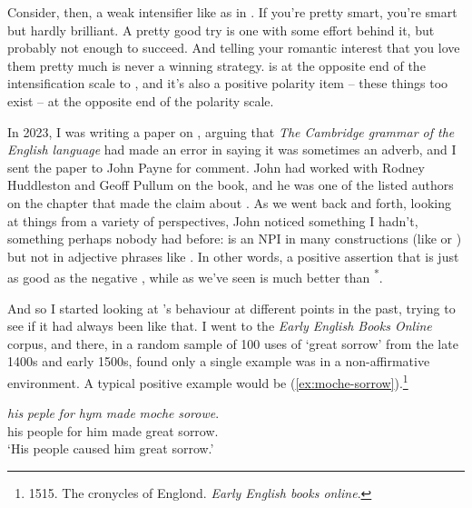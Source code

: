 Consider, then, a weak intensifier like  as in . If you're pretty smart, you're smart but hardly brilliant. A pretty good try is one with some effort behind it, but probably not enough to succeed. And telling your romantic interest that you love them pretty much is never a winning strategy.  is at the opposite end of the intensification scale to , and it's also a positive polarity item -- these things too exist -- at the opposite end of the polarity scale.



In 2023, I was writing a paper on , arguing that \textit{The Cambridge grammar of the English language} had made an error in saying it was sometimes an adverb, and I sent the paper to John Payne for comment. John had worked with Rodney Huddleston and Geoff Pullum on the book, and he was one of the listed authors on the chapter that made the claim about . As we went back and forth, looking at things from a variety of perspectives, John noticed something I hadn't, something perhaps nobody had before:  is an NPI in many constructions (like  or ) but not in adjective phrases like . In other words, a positive assertion that  is just as good as the negative , while as we've seen  is much better than \textsuperscript{*}.



And so I started looking at 's behaviour at different points in the past, trying to see if it had always been like that. I went to the \textit{Early English Books Online} corpus, and there, in a random sample of 100 uses of  `great sorrow' from the late 1400s and early 1500s, found only a single example was in a non-affirmative environment. A typical positive example would be (\ref{ex:moche-sorrow}).\footnote{1515. The cronycles of Englond. \textit{Early English books online}.}

\ea \label{ex:moche-sorrow}
    \gll \textit{his} \textit{peple} \textit{for} \textit{hym} \textit{made} \textit{moche} \textit{sorowe}. \\ his people for him made great sorrow.\\
    \trans `His people caused him great sorrow.'
\z

